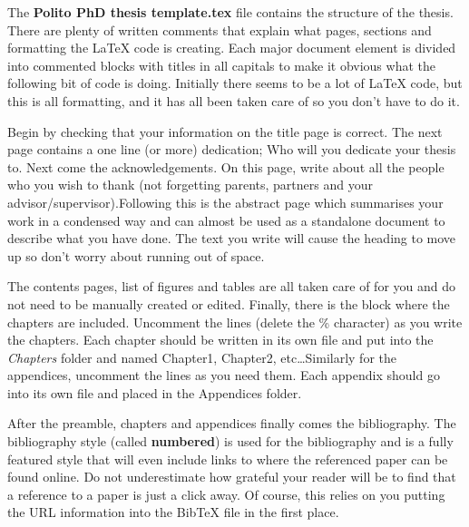 The \textbf{Polito PhD thesis template.tex} file contains the structure of the thesis. There are plenty of written comments that explain what pages, sections and formatting the \LaTeX{} code is creating. Each major document element is divided into commented blocks with titles in all capitals to make it obvious what the following bit of code is doing. Initially there seems to be a lot of \LaTeX{} code, but this is all formatting, and it has all been taken care of so you don't have to do it.

Begin by checking that your information on the title page is correct. The next page contains a one line (or more) dedication; Who will you dedicate your thesis to. Next come the acknowledgements. On this page, write about all the people who you wish to thank (not forgetting parents, partners and your advisor/supervisor).Following this is the abstract page which summarises your work in a condensed way and can almost be used as a standalone document to describe what you have done. The text you write will cause the heading to move up so don't worry about running out of space.

The contents pages, list of figures and tables are all taken care of for you and do not need to be manually created or edited.  Finally, there is the block where the chapters are included. Uncomment the lines (delete the \% character) as you write the chapters. Each chapter should be written in its own file and put into the \emph{Chapters} folder and named Chapter1, Chapter2, etc\ldots Similarly for the appendices, uncomment the lines as you need them. Each appendix should go into its own file and placed in the Appendices folder.

After the preamble, chapters and appendices finally comes the bibliography. The bibliography style (called \textbf{numbered}) is used for the bibliography and is a fully featured style that will even include links to where the referenced paper can be found online. Do not underestimate how grateful your reader will be to find that a reference to a paper is just a click away. Of course, this relies on you putting the URL information into the BibTeX file in the first place.